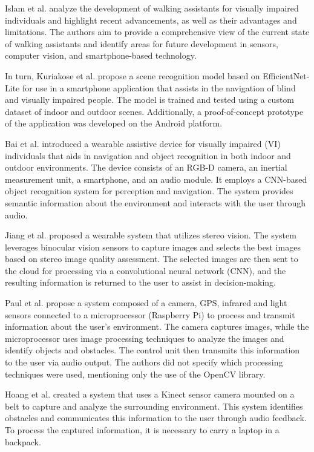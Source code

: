 \documentclass[preprint,12pt,authoryear]{elsarticle}
\begin{document}
Islam et al. \cite{islam2019} analyze the development of walking assistants for visually impaired individuals and highlight recent advancements, as well as their advantages and limitations. The authors aim to provide a comprehensive view of the current state of walking assistants and identify areas for future development in sensors, computer vision, and smartphone-based technology.

In turn, Kuriakose et al. \cite{kuriakose2021} propose a scene recognition model based on EfficientNet-Lite for use in a smartphone application that assists in the navigation of blind and visually impaired people. The model is trained and tested using a custom dataset of indoor and outdoor scenes. Additionally, a proof-of-concept prototype of the application was developed on the Android platform.

Bai et al. \cite{bai2019} introduced a wearable assistive device for visually impaired (VI) individuals that aids in navigation and object recognition in both indoor and outdoor environments. The device consists of an RGB-D camera, an inertial measurement unit, a smartphone, and an audio module. It employs a CNN-based object recognition system for perception and navigation. The system provides semantic information about the environment and interacts with the user through audio.

Jiang et al. \cite{jiang2019} proposed a wearable system that utilizes stereo vision. The system leverages binocular vision sensors to capture images and selects the best images based on stereo image quality assessment. The selected images are then sent to the cloud for processing via a convolutional neural network (CNN), and the resulting information is returned to the user to assist in decision-making.

Paul et al. \cite{joe2019} propose a system composed of a camera, GPS, infrared and light sensors connected to a microprocessor (Raspberry Pi) to process and transmit information about the user's environment. The camera captures images, while the microprocessor uses image processing techniques to analyze the images and identify objects and obstacles. The control unit then transmits this information to the user via audio output. The authors did not specify which processing techniques were used, mentioning only the use of the OpenCV library.

Hoang et al. \cite{hoang2017} created a system that uses a Kinect sensor camera mounted on a belt to capture and analyze the surrounding environment. This system identifies obstacles and communicates this information to the user through audio feedback. To process the captured information, it is necessary to carry a laptop in a backpack.
\end{document}

